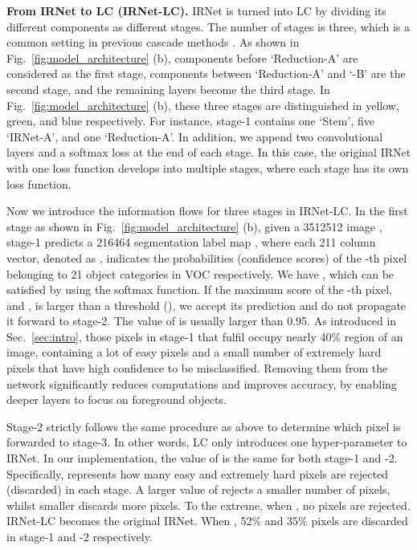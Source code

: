 \documentclass[10pt,twocolumn,letterpaper]{article}
\begin{document}
\noindent
\textbf{From IRNet to LC (IRNet-LC).}
IRNet is turned into LC by dividing its different components as different stages.
The number of stages is three, which is a common setting in previous cascade methods \cite{li2015convolutional, sun2013deep, toshev2014deeppose}.
As shown in Fig.~\ref{fig:model_architecture} (b), components before `Reduction-A' are considered as the first stage, components between `Reduction-A' and `-B' are the second stage, and the remaining layers become the third stage.
In Fig.~\ref{fig:model_architecture} (b), these three stages are distinguished in yellow, green, and blue respectively.
For instance, stage-1 contains one `Stem', five `IRNet-A', and one `Reduction-A'.
In addition, we append two convolutional layers and a softmax loss at the end of each stage.
In this case, the original IRNet with one loss function develops into multiple stages, where each stage has its own loss function.

Now we introduce the information flows for three stages in IRNet-LC.
In the first stage as shown in Fig.~\ref{fig:model_architecture} (b), given a 3512512 image , stage-1 predicts a 216464 segmentation label map , where each 211 column vector, denoted as , indicates the probabilities (confidence scores) of the -th pixel
belonging to 21 object categories in VOC respectively.
We have , which can be satisfied by using the softmax function.
If the maximum score of the -th pixel,  and , is larger than a threshold  (), we accept its prediction and do not propagate it forward to stage-2.
The value of  is usually larger than 0.95.
As introduced in Sec.~\ref{sec:intro}, those pixels in stage-1 that fulfil  occupy nearly 40\% region of an image, containing a lot of easy pixels and a small number of extremely hard pixels that have high confidence to be misclassified.
Removing them from the network significantly reduces computations and improves accuracy, by
enabling deeper layers to focus on foreground objects.

Stage-2 strictly follows the same procedure as above to determine which pixel is forwarded to stage-3.
In other words, LC only introduces one hyper-parameter  to IRNet.
In our implementation, the value of  is the same for both stage-1 and -2.
Specifically,  represents how many easy and extremely hard pixels are rejected (discarded) in each stage.
A larger value of  rejects a smaller number of pixels, whilst smaller  discards more pixels.
To the extreme, when , no pixels are rejected. IRNet-LC becomes the original IRNet.
When , 52\% and 35\% pixels are discarded in stage-1 and -2 respectively.
\end{document}
